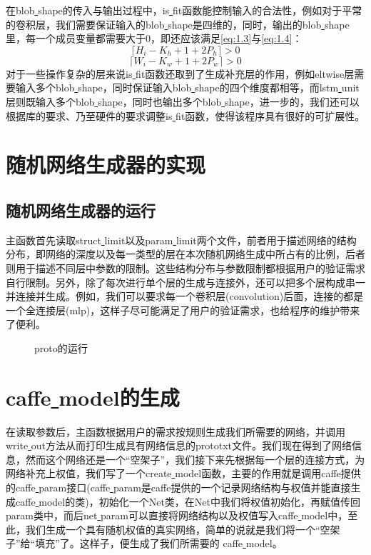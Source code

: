 在blob\underline{ }shape的传入与输出过程中，is\underline{ }fit函数能控制输入的合法性，例如对于平常的卷积层，我们需要保证输入的blob\underline{ }shape是四维的，同时，输出的blob\underline{ }shape里，每一个成员变量都需要大于0，即还应该满足\autoref{eq:1.3}与\autoref{eq:1.4}：
\begin{equation}\label{eq:1.3}
\lceil H_{i}-K_h+1+2P_{h}\rceil >0
\end{equation}
\begin{equation}\label{eq:1.4}
\lceil W_{i}-K_w+1+2P_{w}\rceil >0
\end{equation}
对于一些操作复杂的层来说is\underline{ }fit函数还取到了生成补充层的作用，例如eltwise层需要输入多个blob\underline{ }shape，同时保证输入blob\underline{ }shape的四个维度都相等，而lstm\underline{ }unit层则既输入多个blob\underline{ }shape，同时也输出多个blob\underline{ }shape，进一步的，我们还可以根据库的要求、乃至硬件的要求调整is\underline{ }fit函数，使得该程序具有很好的可扩展性。
\section{随机网络生成器的实现}
\subsection{随机网络生成器的运行}
主函数首先读取struct\underline{ }limit以及param\underline{ }limit两个文件，前者用于描述网络的结构分布，即网络的深度以及每一类型的层在本次随机网络生成中所占有的比例，后者则用于描述不同层中参数的限制。这些结构分布与参数限制都根据用户的验证需求自行限制。另外，除了每次进行单个层的生成与连接外，还可以把多个层构成串一并连接并生成。例如，我们可以要求每一个卷积层(convolution)后面，连接的都是一个全连接层(mlp)，这样子尽可能满足了用户的验证需求，也给程序的维护带来了便利。

\begin{figure}[!htbp]
\centering 
{}
\caption{proto的运行}
\label{fig:limit}
\end{figure}
\section{caffe\underline{ }model的生成}

在读取参数后，主函数根据用户的需求按规则生成我们所需要的网络，并调用write\underline{ }out方法从而打印生成具有网络信息的prototxt文件。我们现在得到了网络信息，然而这个网络还是一个“空架子”，我们接下来先根据每一个层的连接方式，为网络补充上权值，我们写了一个create\underline{ }model函数，主要的作用就是调用caffe提供的caffe\underline{ }param接口(caffe\underline{ }param是caffe提供的一个记录网络结构与权值并能直接生成caffe\underline{ }model的类)，初始化一个Net类，在Net中我们将权值初始化，再赋值传回param类中，而后net\underline{ }param可以直接将网络结构以及权值写入caffe\underline{ }model中，至此，我们生成一个具有随机权值的真实网络，简单的说就是我们将一个“空架子”给“填充”了。这样子，便生成了我们所需要的 caffe\underline{ }model。


